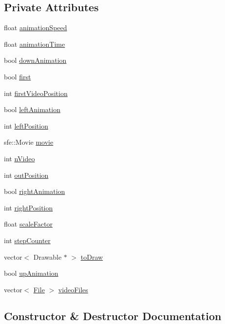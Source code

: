 \subsection*{Private Attributes}
\begin{DoxyCompactItemize}
\item 
float \hyperlink{classVideo_aa7fb4b457e5594265a89474824db2437}{animation\+Speed}
\item 
float \hyperlink{classVideo_a76be94d2c8b95d4d3151fe1fdd00155b}{animation\+Time}
\item 
bool \hyperlink{classVideo_aec0e8ade42cb0336539857309f1329ee}{down\+Animation}
\item 
bool \hyperlink{classVideo_a8d16cd62917d62c5cda8df87f968c9be}{first}
\item 
int \hyperlink{classVideo_a1061f9cbb975530d37e5ef0be54b386a}{first\+Video\+Position}
\item 
bool \hyperlink{classVideo_a9cc3dcc22a6e20b9f1dbc6340386c5d0}{left\+Animation}
\item 
int \hyperlink{classVideo_aae5cccd35042dd9947906c0d25d1d6ca}{left\+Position}
\item 
sfe\+::\+Movie \hyperlink{classVideo_a7caa629bcd7defde560543a16fda097d}{movie}
\item 
int \hyperlink{classVideo_abeb02719d0e789cc53428317c1d8cb51}{n\+Video}
\item 
int \hyperlink{classVideo_afa1d75f88328a80b477f2016dec95a10}{out\+Position}
\item 
bool \hyperlink{classVideo_ab61a504587371180bb6533ed99e1a688}{right\+Animation}
\item 
int \hyperlink{classVideo_a5edc214489dc7ffb30cbfe0849771537}{right\+Position}
\item 
float \hyperlink{classVideo_a9437d769e28b21103b07da7092569e2e}{scale\+Factor}
\item 
int \hyperlink{classVideo_a862be3ec8e981fe12e515c21e79f32c0}{step\+Counter}
\item 
vector$<$ Drawable $\ast$ $>$ \hyperlink{classVideo_a6b8b02006dbbe4a6cc2b469024c383a8}{to\+Draw}
\item 
bool \hyperlink{classVideo_a997f7ceb635d7897d2eed00cf6faaf19}{up\+Animation}
\item 
vector$<$ \hyperlink{classFile}{File} $>$ \hyperlink{classVideo_ae6b3a3fcfb9d7379aa39523a70dff6c7}{video\+Files}
\end{DoxyCompactItemize}


\subsection{Constructor \& Destructor Documentation}

